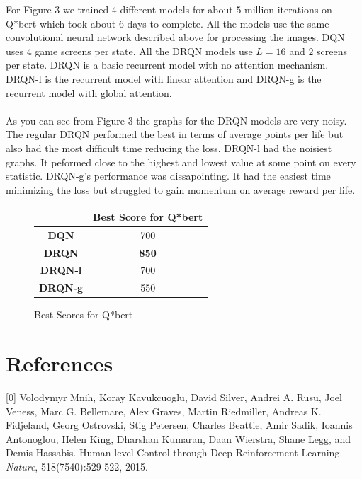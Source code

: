 \documentclass{article}
\begin{document}
For Figure 3 we trained $4$ different models for about $5$ million iterations on
Q*bert which took about $6$ days to complete. All the models use the same
convolutional neural network described above for processing the images. DQN uses
$4$ game screens per state. All the DRQN models use $L=16$ and $2$ screens per
state. DRQN is a basic recurrent model with no attention mechanism. DRQN-l is the
recurrent model with linear attention and DRQN-g is the recurrent model with
global attention. \\
\\
As you can see from Figure 3 the graphs for the DRQN models are very noisy. The
regular DRQN performed the best in terms of average points per life but also had
the most difficult time reducing the loss. DRQN-l had the noisiest graphs. It
peformed close to the highest and lowest value at some point on every statistic.
DRQN-g's performance was dissapointing. It had the easiest time minimizing the loss
but struggled to gain momentum on average reward per life. \\

\begin{figure}[h]
    \begin{center}
        \begin{tabular}{| c | c |}
            \hline
            & \textbf{Best Score for Q*bert} \\ \hline
            \textbf{DQN} & 700 \\ \hline 
            \textbf{DRQN} & \textbf{850} \\ \hline
            \textbf{DRQN-l} & 700 \\ \hline
            \textbf{DRQN-g} & 550 \\ \hline
        \end{tabular}
    \end{center}
    \caption{Best Scores for Q*bert}
\end{figure}

\section*{References}
\small
[0] Volodymyr Mnih, Koray Kavukcuoglu, David Silver, Andrei A. Rusu, Joel Veness, Marc G. Bellemare, Alex Graves, Martin Riedmiller, Andreas K. Fidjeland, Georg Ostrovski, Stig Petersen, Charles Beattie, Amir Sadik, Ioannis Antonoglou, Helen King, Dharshan Kumaran, Daan Wierstra, Shane Legg, and Demis Hassabis. Human-level Control through Deep Reinforcement Learning. {\it Nature}, 518(7540):529-522, 2015.
\end{document}
